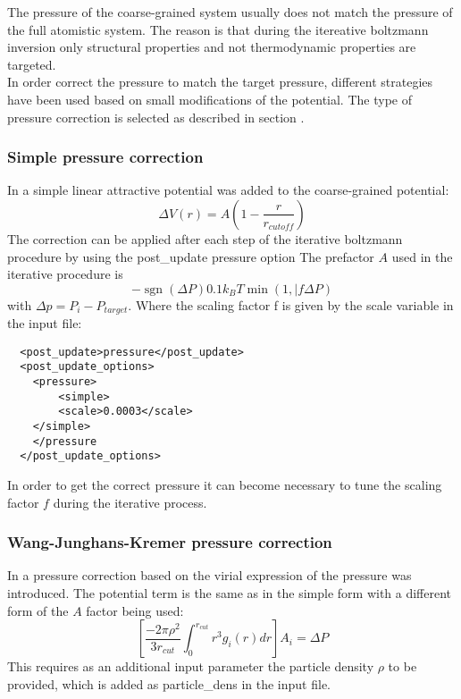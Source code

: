 The pressure of the coarse-grained system usually does not match the pressure of the full atomistic system. The reason is that during the itereative boltzmann inversion only structural properties and not thermodynamic properties are targeted.\\
In order correct the pressure to match the target pressure, different strategies have been used based on small modifications of the potential. The type of pressure correction is selected as described in section .

\subsubsection{Simple pressure correction}

In \cite{Reith:2003} a simple linear attractive potential was added to the coarse-grained potential:
\begin{equation}\Delta V(r)=A(1-\frac{r}{r_{cutoff}})\end{equation}
The correction can be applied after each step of the iterative boltzmann procedure by using the post\_update pressure option
The prefactor $A$ used in the iterative procedure is 
\begin{equation}-\operatorname{sgn}(\Delta P)0.1k_{B}T\min(1,|f\Delta P)\end{equation}
 with $\Delta p=P_i-P_{target}$. Where the scaling factor f is given by the scale variable in the input file:
\begin{verbatim}
  <post_update>pressure</post_update>
  <post_update_options>
    <pressure>
        <simple>
		<scale>0.0003</scale>
	</simple>
    </pressure
  </post_update_options>
\end{verbatim}
In order to get the correct pressure it can become necessary to tune the scaling factor $f$ during the iterative process.
\subsubsection{Wang-Junghans-Kremer pressure correction}

In \cite{Wang:2009} a pressure correction based on the virial expression of the pressure was introduced. The potential term is the same as in the simple form with a different form of the $A$ factor being used:
\begin{equation}\left[\frac{-2\pi\rho^{2}}{3r_{cut}}\int_{0}^{r_{cut}}r^{3}g_{i}(r)dr\right]A_{i}=\Delta P\end{equation}
This requires as an additional input parameter the particle density $ \rho $ to be provided, which is added as particle\_dens in the input file. 

